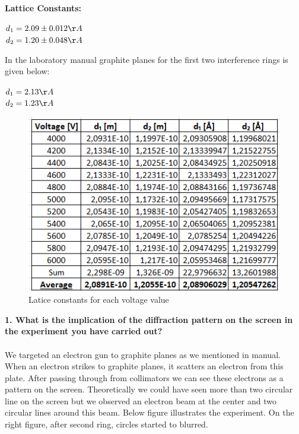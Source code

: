 \documentclass[a4paper,12pt]{article}
\begin{document}
\textbf{Lattice Constants:}
\begin{center}
	$d_{1}=2.09 \pm 0.012 \AA{}$\\
    $d_{2}=1.20 \pm 0.048\AA{}$
\end{center}
In the laboratory manual graphite planes for the first two interference rings is given below:\\
\begin{center}
	$d_{1}=2.13 \AA{}$\\
	$d_{2}=1.23 \AA{}$
\end{center}
\newpage
\begin{figure}[h!]
\centering
\includegraphics[scale = 1.0]{"table 2"}
\caption{Latice constants for each voltage value }
\label{fig:table2}
\end{figure}
\textbf{1. What is the implication of the diffraction pattern on the screen in the experiment you have carried out?}\\\\
We targeted an electron gun to graphite planes as we mentioned in manual. When an electron strikes to graphite planes, it scatters an electron from this plate. After passing through from collimators we can see these electrons as a pattern on the screen. Theoretically we could have seen more than two circular line on the screen but we observed an electron beam at the center and two circular lines around this beam. Below figure illustrates the experiment. On the right figure, after second ring, circles started to blurred.\\\\
\end{document}
